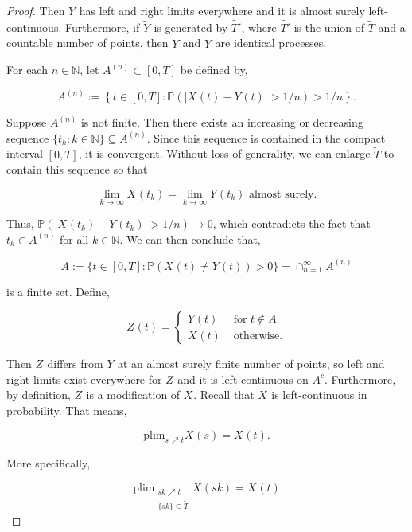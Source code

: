 \documentclass[12pt]{article}
\newcommand{\mb}{\mathbb}
\newcommand{\ra}{\rightarrow}
\newcommand{\te}{\text}
\newcommand{\ind}{\hspace{24pt}}
\newcommand{\pr}{\mb{P}}							%
\newcommand{\T}{T}								%
\renewcommand{\t}{t}							%
\renewcommand{\tt}{s}							%
\newcommand{\X}{X}								%
\newcommand{\cind}[1]{_{#1}}					%
\newcommand{\tp}[1]{(#1)}						%
\newcommand{\tip}[1]{#1}						%
\newcommand{\sln}[1]{^{(#1)}}					%
\newcommand{\alt}[1]{\widetilde{#1}}			%
\newcommand{\indx}[1]{_{#1}}					%
\newcommand{\XX}{Y}								%
\newcommand{\XXX}{Z}							%
\renewcommand{\it}{k}							%
\newcommand{\Tset}{\alt{T}}						%
\newcommand{\typset}{A}							%
\begin{document}
\begin{proof}
Then \(\XX\cind{}\tip{}\) has left and right limits everywhere and it is almost surely left-continuous. Furthermore, if \(\alt{\XX\cind{}\tip{}}\) is generated by \(\alt{T'}\), where \(\alt{T'}\) is the union of \(\Tset\) and a countable number of points, then \(\XX\cind{}\tip{}\) and \(\alt{\XX\cind{}\tip{}}\) are identical processes. 

\ind For each \(n \in \mb{N}\), let \(\typset\sln{n} \subset [0,\T]\) be defined by,

\[\typset\sln{n} := \left\{\t\in [0,\T]: \pr\left(|\X\cind{}\tp{\t} - \XX\cind{}\tp{\t}| > 1/n\right) > 1/n\right\}.\] 

Suppose \(\typset\sln{n}\) is not finite. Then there exists an increasing or decreasing sequence \(\{\t\indx{\it}:\it\in \mb{N}\}\subseteq \typset\sln{n}\). Since this sequence is contained in the compact interval \([0,\T]\), it is convergent. Without loss of generality, we can enlarge \(\Tset\) to contain this sequence so that

\[\lim_{\it \ra\infty} \X\cind{}\tp{\t\indx{\it}} = \lim_{\it\ra\infty} \XX\cind{}\tp{\t\indx{\it}} \te{ almost surely.}\]

Thus, \(\pr(|\X\cind{}\tp{\t\indx{\it}} - \XX\cind{}\tp{\t\indx{\it}}| > 1/n) \ra 0\), which contradicts the fact that \(\t\indx{\it} \in \typset\sln{n}\) for all \(\it\in\mb{N}\). We can then conclude that,

\[\typset:= \{\t\in [0,\T]: \pr(\X\cind{}\tp{\t} \neq \XX\cind{}\tp{\t}) > 0\} = \cap_{n = 1}^\infty \typset\sln{n}\]

is a finite set. Define,

\[\XXX\cind{}\tp{\t}= \begin{cases}
\XX\cind{}\tp{\t} &\te{ for } \t \notin \typset\\
\X\cind{}\tp{\t} &\te{ otherwise.}
\end{cases}\]

Then \(\XXX\cind{}\tip{}\) differs from \(\XX\cind{}\tip{}\) at an almost surely finite number of points, so left and right limits exist everywhere for \(\XXX\cind{}\tip{}\) and it is left-continuous on \(\typset^c\). Furthermore, by definition, \(\XXX\cind{}\tip{}\) is a modification of \(\X\cind{}\tip{}\). Recall that \(\X\cind{}\tip{}\) is left-continuous in probability. That means,

\[\te{plim}_{\tt\nearrow \t} \X\cind{}\tp{\tt} = \X\cind{}\tp{\t}.\]

More specifically,

\[\te{plim}_{\substack{\tt{\it}\nearrow \t\\\{\tt{\it}\} \subseteq \Tset}} \X\cind{}\tp{\tt{\it}} = \X\cind{}\tp{\t}\]


\end{proof}
\end{document}
